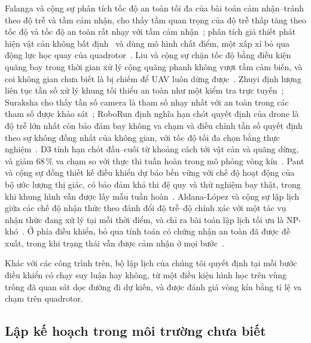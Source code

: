 \documentclass[11pt,a4paper]{article}
\theoremstyle{plain}
\theoremstyle{definition}
\theoremstyle{remark}
\begin{document}
Falanga và cộng sự phân tích tốc độ an toàn tối đa của bài toán cảm nhận--tránh theo độ trễ và tầm cảm nhận, cho thấy tầm quan trọng của độ trễ thấp tăng theo tốc độ và tốc độ an toàn rất nhạy với tầm cảm nhận~\cite{falanga2019}; phân tích giả thiết phát hiện vật cản không bất định~\cite{falanga2019} và dùng mô hình chất điểm, một xấp xỉ bỏ qua động lực học quay của quadrotor~\cite{loquercio2021}. Liu và cộng sự chặn tốc độ bằng điều kiện quãng bay trong thời gian xử lý cộng quãng phanh không vượt tầm cảm biến, và coi không gian chưa biết là bị chiếm để UAV luôn dừng được~\cite{liu2016}. Zhuyi định lượng liên tục tần số xử lý khung tối thiểu an toàn như một kiểm tra trực tuyến~\cite{hsiao2022}; Suraksha cho thấy tần số camera là tham số nhạy nhất với an toàn trong các tham số được khảo sát~\cite{zhao2021}; RoboRun định nghĩa hạn chót quyết định của drone là độ trễ lớn nhất còn bảo đảm bay không va chạm và điều chỉnh tần số quyết định theo sự không đồng nhất của không gian, với tốc độ tối đa chọn bằng thực nghiệm~\cite{boroujerdian2021}. D3 tính hạn chót đầu--cuối từ khoảng cách tới vật cản và quãng dừng, và giảm 68\,\% va chạm so với thực thi tuần hoàn trong mô phỏng vòng kín~\cite{gog2022}. Pant và cộng sự đồng thiết kế điều khiển dự báo bền vững với chế độ hoạt động của bộ ước lượng thị giác, có bảo đảm khả thi đệ quy và thử nghiệm bay thật, trong khi khung hình vẫn được lấy mẫu tuần hoàn~\cite{pant2021}. Aldana-López và cộng sự lập lịch giữa các chế độ nhận thức theo đánh đổi độ trễ--độ chính xác với một tác vụ nhận thức đang xử lý tại mỗi thời điểm, và chỉ ra bài toán lập lịch tối ưu là NP-khó~\cite{aldana2023}. Ở phía điều khiển, bỏ qua tính toán có chứng nhận an toàn đã được đề xuất, trong khi trạng thái vẫn được cảm nhận ở mọi bước~\cite{huang2020}.

Khác với các công trình trên, bộ lập lịch của chúng tôi quyết định tại mỗi bước điều khiển có chạy suy luận hay không, từ một điều kiện hình học trên vùng trống đã quan sát dọc đường đi dự kiến, và được đánh giá vòng kín bằng tỉ lệ va chạm trên quadrotor.

\subsection{Lập kế hoạch trong môi trường chưa biết}
\end{document}
